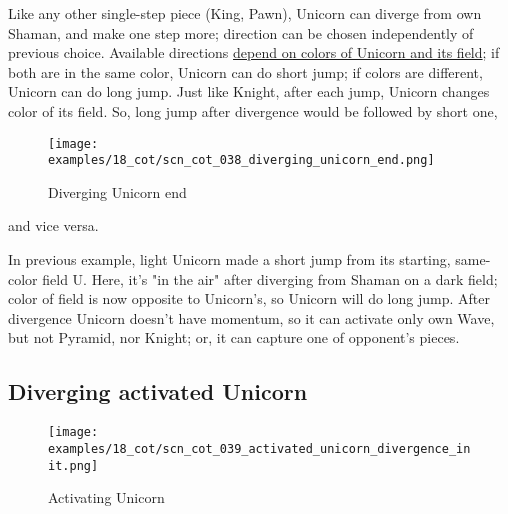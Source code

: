 \vspace*{-0.5\baselineskip}
Like any other single-step piece (King, Pawn), Unicorn can diverge from own Shaman,
and make one step more; direction can be chosen independently of previous choice.
Available directions
\hyperref[fig:scn_aoa_01_unicorn_same_color]{depend on colors of Unicorn and its field};
if both are in the same color, Unicorn can do short jump; if colors are different, Unicorn
can do long jump. Just like Knight, after each jump, Unicorn changes color of its field.
So, long jump after divergence would be followed by short one,

\clearpage %

\vspace*{-2.1\baselineskip}
\noindent
\begin{figure}[!h]
\texttt{[image: examples/18\_cot/scn\_cot\_038\_diverging\_unicorn\_end.png]}
\vspace*{-1.3\baselineskip}
\caption{Diverging Unicorn end}
\label{fig:scn_cot_038_diverging_unicorn_end}
\end{figure}

\vspace*{-0.4\baselineskip}
\noindent
and vice versa.

In previous example, light Unicorn made a short jump from its starting, same-color
field U. Here, it's "in the air" after diverging from Shaman on a dark field; color
of field is now opposite to Unicorn's, so Unicorn will do long jump.
After divergence Unicorn doesn't have momentum, so it can activate only own Wave,
but not Pyramid, nor Knight; or, it can capture one of opponent's pieces.

\clearpage %

\subsection*{Diverging activated Unicorn}
\label{sec:Conquest of Tlalocan/Divergence/Diverging activated Unicorn}

\vspace*{-1.4\baselineskip}
\noindent
\begin{figure}[!h]
\texttt{[image: examples/18\_cot/scn\_cot\_039\_activated\_unicorn\_divergence\_init.png]}
\vspace*{-1.3\baselineskip}
\caption{Activating Unicorn}
\label{fig:scn_cot_039_activated_unicorn_divergence_init}
\end{figure}

